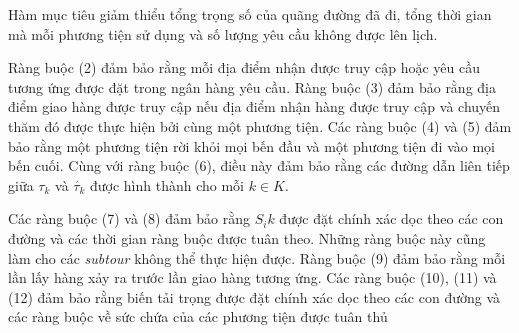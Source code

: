 Hàm mục tiêu giảm thiểu tổng trọng số của quãng đường đã đi, tổng thời gian mà mỗi phương tiện sử dụng và số lượng yêu cầu không được lên lịch.

Ràng buộc (2) đảm bảo rằng mỗi địa điểm nhận được truy cập hoặc yêu cầu tương ứng được đặt trong ngân hàng yêu cầu. Ràng buộc (3) đảm bảo rằng địa điểm giao hàng được truy cập nếu địa điểm nhận hàng được truy cập và chuyến thăm đó được thực hiện bởi cùng một phương tiện. Các ràng buộc (4) và (5) đảm bảo rằng một phương tiện rời khỏi mọi bến đầu và một phương tiện đi vào mọi bến cuối. Cùng với ràng buộc (6), điều này đảm bảo rằng các đường dẫn liên tiếp giữa $\tau_k$ và $\acute{\tau_k}$ được hình thành cho mỗi $k \in K$.

Các ràng buộc (7) và (8) đảm bảo rằng $S_ik$ được đặt chính xác dọc theo các con đường và các thời gian ràng buộc được tuân theo. Những ràng buộc này cũng làm cho các \textit{subtour} không thể thực hiện được.
Ràng buộc (9) đảm bảo rằng mỗi lần lấy hàng xảy ra trước lần giao hàng tương ứng. Các ràng buộc (10), (11) và (12) đảm bảo rằng biến tải trọng được đặt chính xác dọc theo các con đường và các ràng buộc về sức chứa của các phương tiện được tuân thủ
